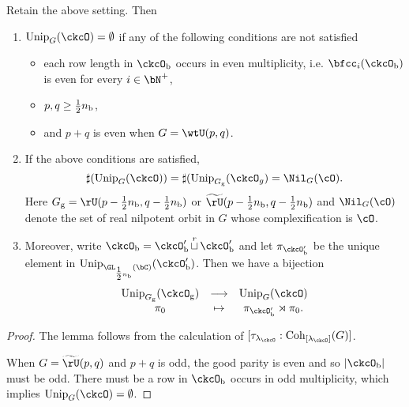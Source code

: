 \documentclass[counting_main.tex]{subfiles}
\begin{document}
\begin{thm}
  Retain the above setting. Then
  \begin{enumerate}[label=(\alph*)]
    \item $\Unip_{G}(\ckcO)= \emptyset$ if any of the following conditions are
          not satisfied
          \begin{itemize}
            \item each row length in $\ckcOb$ occurs in even multiplicity, i.e.
                  $\bfcc_{i}(\ckcOb)$ is even for every $i\in \bN^{+}$,
            \item $p,q \geq {\tfrac{1}{2}} n_{\mathrm b}$,
            \item and $p+q$ is even when $G = \wtU(p,q)$.
          \end{itemize}
    \item If the above conditions are satisfied,
          \[
          \sharp(\Unip_{G}(\ckcO)) = \sharp(\Unip_{\Gg}(\ckcO_{g}) = \Nil_{G}(\cO).
          \]
          Here $\Gg = \rU(p-\half \nbb,q-\half \nbb)$ or
          $\tU(p-\half \nbb,q-\half \nbb)$ and $\Nil_{G}(\cO)$ denote the set of
          real nilpotent orbit in $G$ whose complexification is $\cO$.
    \item Moreover, write $\ckcOb = \ckcOpb\cuprow \ckcOpb$ and let
          $\pi_{\ckcOpb}$ be the unique element in
          $\Unip_{\GL_{\half\nbb}(\bC)}(\ckcOpb)$. Then we have a bijection
          \[
          \begin{array}{ccc}
            \Unip_{\Gg}(\ckcOg) &\longrightarrow & \Unip_{G}(\ckcO)\\
            \pi_{0}& \mapsto & \pi_{\ckcOpb}\rtimes \pi_{0}. \\
          \end{array}
          \]
  \end{enumerate}
\end{thm}
\begin{proof}
  The lemma follows from the calculation of $[\tau_{\lamck}:\Cint{\lamck}(G)]$.

  When $G = \tU(p,q)$ and $p+q$ is odd, the good parity is even and so
  $\abs{\ckcOb}$ must be odd. There must be a row in $\ckcOb$ occurs in
  odd multiplicity, which implies $\Unip_{G}(\ckcO)=\emptyset$.
\end{proof}
\end{document}
